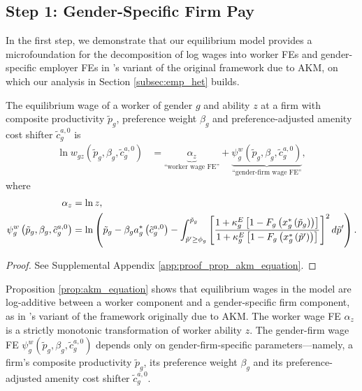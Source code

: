 \subsection{Step 1: Gender-Specific Firm Pay\label{subsec:equilibrium_wage_equation}}

In the first step, we demonstrate that our equilibrium model provides a microfoundation for the decomposition of log wages into worker FEs and gender-specific employer FEs in \citeauthor{CardCardosoKline2016}'s \citeyearpar{CardCardosoKline2016} variant of the original framework due to AKM, on which our analysis in Section \ref{subsec:emp_het} builds.

%
\newcommand{\PropEquilibriumWageEquation}[2]{%
    The equilibrium wage of a worker of gender $g$ and ability $z$ at a firm with composite productivity $\tilde{p}_{g}$, preference weight $\beta_{g}$ and preference-adjusted amenity cost shifter $\tilde{c}_{g}^{a,0}$ is
    \begin{align}
        \ln w_{gz}\left(\tilde{p}_{g}, \beta_{g}, \tilde{c}_{g}^{a,0} \right) %
        &= \underbrace{\alpha_{z}}_{\text{``worker wage FE''}} + \underbrace{ \psi_{g}^{w} \left( \tilde{p}_{g}, \beta_{g}, \tilde{c}_{g}^{a,0} \right) }_{\text{``gender-firm wage FE''}}, \label{#1}
    \end{align}
    where
    \begin{align}
        \alpha_{z} %
        &= \ln z, \\
        \psi_{g}^{w} \left( \tilde{p}_{g}, \beta_{g}, \tilde{c}_{g}^{a,0} \right) %
        &= \ln \left( \tilde{p}_{g} - \beta_{g} a_{g}^{*}\left(\tilde{c}_{g}^{a,0}\right) %
        - \int_{\tilde{p}' \ge \phi_{g}}^{\tilde{p}_{g}} \left[ \frac{1 + \kappa_{g}^{E} \left[ 1 - F_{g}\left(x_{g}^{*}\left(\tilde{p}_{g}\right)\right) \right]}{1 + \kappa_{g}^{E} \left[ 1 - F_{g}\left(x_{g}^{*}\left(\tilde{p}'\right)\right) \right]} \right]^{2} \diff \tilde{p}' \right). \label{#2}
    \end{align}
}
%
\begin{proposition}
    \label{prop:akm_equation}
    \PropEquilibriumWageEquation{eq:prop_AKM_endog}{eq:psi}
\end{proposition}
%
\begin{proof}
    See Supplemental Appendix \ref{app:proof_prop_akm_equation}.
\end{proof}
%
Proposition \ref{prop:akm_equation} shows that equilibrium wages in the model are log-additive between a worker component and a gender-specific firm component, as in \citeauthor{CardCardosoKline2016}'s \citeyearpar{CardCardosoKline2016} variant of the framework originally due to AKM. The worker wage FE $\alpha_{z}$ is a strictly monotonic transformation of worker ability $z$. The gender-firm wage FE $\psi_{g}^{w}(\tilde{p}_{g}, \beta_{g}, \tilde{c}_{g}^{a,0})$ depends only on gender-firm-specific parameters---namely, a firm's composite productivity $\tilde{p}_{g}$, its preference weight $\beta_{g}$ and its preference-adjusted amenity cost shifter $\tilde{c}_{g}^{a,0}$.

